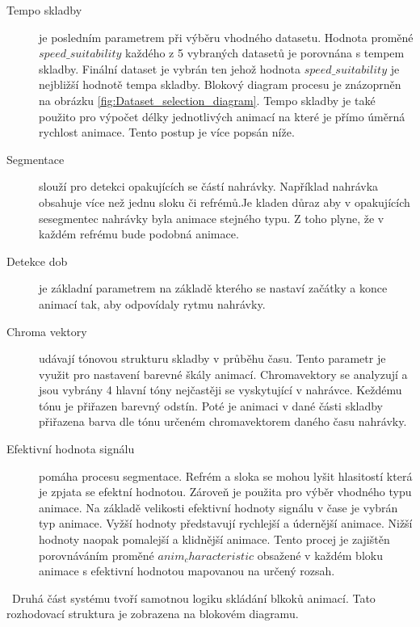 \begin{description}
    \item[Tempo skladby] je posledním parametrem při výběru vhodného datasetu. 
    Hodnota proměné $speed\_suitability$ každého z 5 vybraných datasetů je porovnána s tempem skladby. Finální dataset je vybrán ten jehož hodnota $speed\_suitability$ je nejbližší hodnotě tempa skladby. Blokový diagram procesu je znázoprněn na obrázku \ref{fig:Dataset_selection_diagram}. Tempo skladby je také použito pro výpočet délky jednotlivých animací na které je přímo úměrná rychlost animace. Tento postup je více popsán níže. %
    \item[Segmentace] slouží pro detekci opakujících se částí nahrávky. Například nahrávka obsahuje více než jednu sloku či refrémů.Je kladen důraz aby v opakujících sesegmentec nahrávky byla animace stejného typu. Z toho plyne, že v každém refrému bude podobná animace.
    \item[Detekce dob] je základní parametrem na základě kterého se nastaví začátky a konce animací tak, aby odpovídaly rytmu nahrávky.
    \item[Chroma vektory] udávají tónovou strukturu skladby v průběhu času. Tento parametr je využit pro nastavení barevné škály animací. Chromavektory se analyzují a jsou vybrány 4 hlavní tóny nejčastěji se vyskytující v nahrávce. Keždému tónu je přiřazen barevný odstín. Poté je animaci v dané části skladby přiřazena barva dle tónu určeném chromavektorem daného času nahrávky.
    \item[Efektivní hodnota signálu] pomáha procesu segmentace. Refrém a sloka se mohou lyšit hlasitostí která je zpjata se efektní hodnotou. Zároveň je použita pro výběr vhodného typu animace. Na základě velikosti efektivní hodnoty signálu v čase je vybrán typ animace. Vyžší hodnoty představují rychlejší a údernější animace. Nižší hodnoty naopak pomalejší a klidnější animace. Tento procej je zajištěn porovnáváním proměné $anim_characteristic$ obsažené v každém bloku animace s efektivní hodnotou mapovanou na určený rozsah.
\end{description}

\
Druhá část systému tvoří samotnou logiku skládání blkoků animací. Tato rozhodovací struktura je zobrazena na blokovém diagramu.

